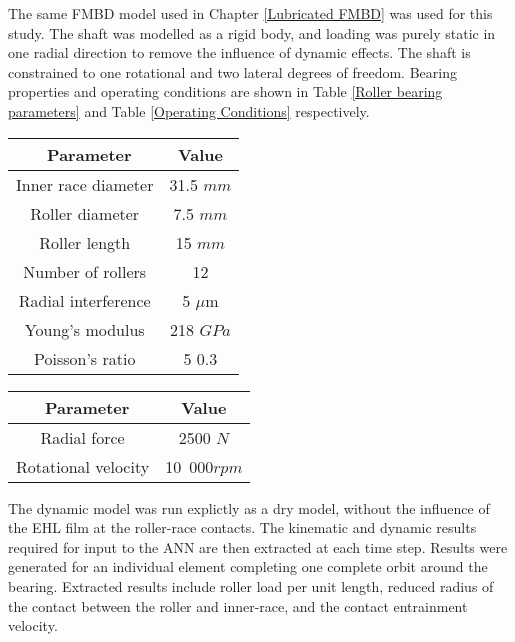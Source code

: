 The same FMBD model used in Chapter \ref{Lubricated FMBD} was used for this study. The shaft was modelled as a rigid body, and loading was purely static in one radial direction to remove the influence of dynamic effects. The shaft is constrained to one rotational and two lateral degrees of freedom. Bearing properties and operating conditions are shown in Table \ref{Roller bearing parameters} and Table \ref{Operating Conditions} respectively.

\begin{table*}
	\caption{Roller Bearing Parameters}
	\label{Roller bearing parameters}
	\centering
	\renewcommand{\arraystretch}{1.5}%
	\begin{tabular}{|c|c|}
		\hline
		\ \textbf{Parameter} & \textbf{Value} \\ [0.5ex]
		\hline
		Inner race diameter & 31.5 $mm$ \\ [0.5ex]
		\hline
		Roller diameter & 7.5 $mm$ \\ [0.5ex]
		\hline
		Roller length & 15 $mm$ \\ [0.5ex]
		\hline
		Number of rollers & 12 \\ [0.5ex]
		\hline
		Radial interference & 5 $\mu \mathrm{m}$ \\ [0.5ex]
		\hline
		Young's modulus & 218 $GPa$ \\ [0.5ex]
		\hline
		Poisson's ratio & 5 $0.3$ \\ [0.5ex]
		\hline
	\end{tabular}
\end{table*}

\begin{table*}
	\caption{Operating Conditions}
	\label{Operating Conditions}
	\centering
	\renewcommand{\arraystretch}{1.5}%
	\begin{tabular}{|c|c|}
		\hline
		\ \textbf{Parameter} & \textbf{Value} \\ [0.5ex]
		\hline
		Radial force & 2500 $N$ \\ [0.5ex]
		\hline
		Rotational velocity & 10~000$rpm$ \\ [0.5ex]
		\hline
	\end{tabular}
\end{table*}

The dynamic model was run explictly as a dry model, without the influence of the EHL film at the roller-race contacts. The kinematic and dynamic results required for input to the ANN are then extracted at each time step. Results were generated for an individual element completing one complete orbit around the bearing. Extracted results include roller load per unit length, reduced radius of the contact between the roller and inner-race, and the contact entrainment velocity.

